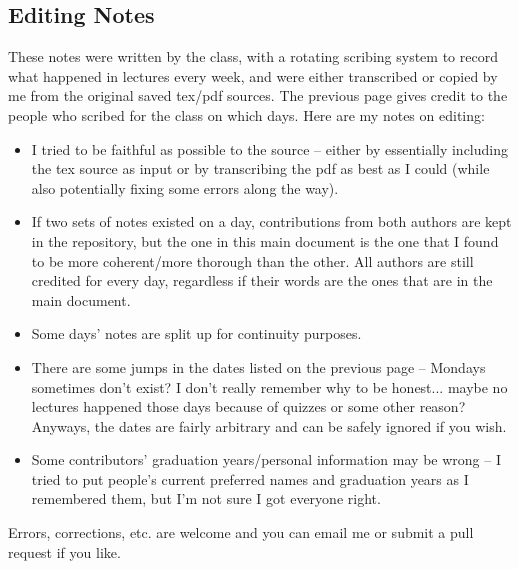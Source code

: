 \subsection{Editing Notes}
These notes were written by the class, with a rotating scribing system to record
what happened in lectures every week, and were either transcribed or copied by me
from the original saved tex/pdf sources. The previous page gives credit to the
people who scribed for the class on which days. Here are my notes on editing: 
\begin{itemize}
    \item I tried to be faithful as possible to the source -- either by essentially including 
    the tex source as input or by transcribing the pdf as best as I could (while also potentially
    fixing some errors along the way).
    \item If two sets of notes existed on a day, contributions from both authors are 
    kept in the repository, but the one in this main document is the one that I found to be
    more coherent/more thorough than the other. All authors are still credited for every day, 
    regardless if their words are the ones that are in the main document. 
    \item Some days' notes are split up for continuity purposes. 
    \item There are some jumps in the dates listed on the previous page 
    -- Mondays sometimes don't exist? I don't really remember why
    to be honest... maybe no lectures happened those days because of quizzes or some other 
    reason? Anyways, the dates are fairly arbitrary and can be safely ignored if you wish. 
    \item Some contributors' graduation years/personal information may be wrong -- I tried to 
    put people's current preferred names and graduation years as I remembered them, but I'm 
    not sure I got everyone right. 
\end{itemize}
Errors, corrections, etc. are welcome and you can email me or submit a pull request if you like.